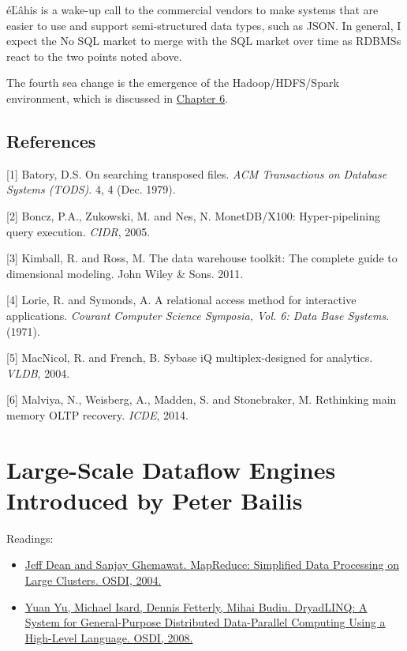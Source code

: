 \documentclass[b5paper,11pt,twoside,openright]{book}
\newcommand\Chapter[3]{
  \hypertarget{#1}{
    \chapter[#2]{#2\\{\Large #3}}\label{#1}
  }
}
\begin{document}
éĽâhis is a wake-up call to the commercial vendors to make systems that
are easier to use and support semi-structured data types, such as JSON.
In general, I expect the No SQL market to merge with the SQL market over
time as RDBMSs react to the two points noted above.

The fourth sea change is the emergence of the Hadoop/HDFS/Spark
environment, which is discussed in \hyperref[ch6-isolation]{Chapter 6}.

\section*{References}

\leavevmode\hypertarget{ref-earlycolumn1}{}%
{[}1{]} Batory, D.S. On searching transposed files. \emph{ACM
  Transactions on Database Systems (TODS)}. 4, 4 (Dec. 1979).

\leavevmode\hypertarget{ref-monetdb}{}%
{[}2{]} Boncz, P.A., Zukowski, M. and Nes, N. MonetDB/X100:
Hyper-pipelining query execution. \emph{CIDR}, 2005.

\leavevmode\hypertarget{ref-kimball-book}{}%
{[}3{]} Kimball, R. and Ross, M. The data warehouse toolkit: The
complete guide to dimensional modeling. John Wiley \& Sons. 2011.

\leavevmode\hypertarget{ref-earlycolumn2}{}%
{[}4{]} Lorie, R. and Symonds, A. A relational access method for
interactive applications. \emph{Courant Computer Science Symposia, Vol.
  6: Data Base Systems}. (1971).

\leavevmode\hypertarget{ref-sybase}{}%
{[}5{]} MacNicol, R. and French, B. Sybase iQ multiplex-designed for
analytics. \emph{VLDB}, 2004.

\leavevmode\hypertarget{ref-commandlogging}{}%
{[}6{]} Malviya, N., Weisberg, A., Madden, S. and Stonebraker, M.
Rethinking main memory OLTP recovery. \emph{ICDE}, 2014.



\Chapter{ch5-dataflow}{%
Large-Scale Dataflow Engines
}{%
Introduced by Peter Bailis
}

\begin{framed}
Readings:
\begin{itemize}
\item
\href{https://scholar.google.com/scholar?cluster=10940266603640308767}{Jeff
  Dean and Sanjay Ghemawat. {MapReduce: Simplified Data Processing on
    Large Clusters}. {OSDI}, 2004.}
\item
\href{https://scholar.google.com/scholar?cluster=3662601067977846800}{Yuan
  Yu, Michael Isard, Dennis Fetterly, Mihai Budiu. {DryadLINQ: A System
    for General-Purpose Distributed Data-Parallel Computing Using a
    High-Level Language}. {OSDI}, 2008.}
\end{itemize}
\end{framed}
\end{document}
